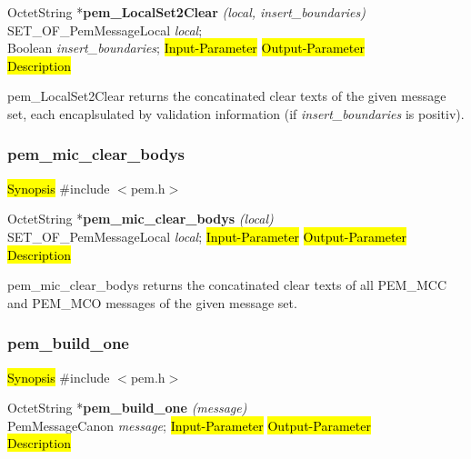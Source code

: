 OctetString *{\bf pem\_LocalSet2Clear} {\em (local, insert\_boundaries)} \\
SET\_OF\_PemMessageLocal {\em *local};\\
Boolean {\em insert\_boundaries};
\hl{Input-Parameter}
\hl{Output-Parameter}
 \\
\hl{Description}

pem\_LocalSet2Clear returns the concatinated clear texts of the given message set,
each encaplsulated
by validation information (if {\em insert\_boundaries} is positiv).









\subsubsection{pem\_mic\_clear\_bodys}
\label{pem_mic_clear_bodys}
\hl{Synopsis}
\#include $<$pem.h$>$ 

OctetString *{\bf pem\_mic\_clear\_bodys} {\em (local)} \\
SET\_OF\_PemMessageLocal {\em *local};
\hl{Input-Parameter}
\hl{Output-Parameter}
 \\
\hl{Description}

pem\_mic\_clear\_bodys returns the concatinated clear texts of all  PEM\_MCC and PEM\_MCO messages
of the given message set.







\subsubsection{pem\_build\_one}
\label{pem_build_one}
\hl{Synopsis}
\#include $<$pem.h$>$ 

OctetString *{\bf pem\_build\_one} {\em (message)} \\
PemMessageCanon {\em *message};
\hl{Input-Parameter}
\hl{Output-Parameter}
 \\
\hl{Description}

